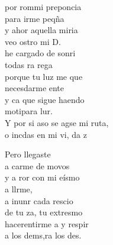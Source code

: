 \begin{cancion}
	por rommi preponcia \\
	para irme peqña\\
	y ahor aquella miria\\
	veo ostro mi D. \\
	 he cargado de sonri \\
	todas ra rega\\
	porque tu luz me que \\
	necesdarme ente \\
	y ca que sigue haendo \\
	motipara lur. \\
	Y por si aso se agse mi ruta,\\
	o incdas en mi vi, da z\\
	\begin{chorus}%
	Pero llegaste   \\
	a carme de movos\\
	y a ror con mi eísmo\\
	a llrme, \\
	a inunr cada rescio\\
	de tu za, tu extresmo \\
	hacerentirme a y respir \\
	a los dems,ra los des. \\
	\end{chorus}%
\end{cancion}%
